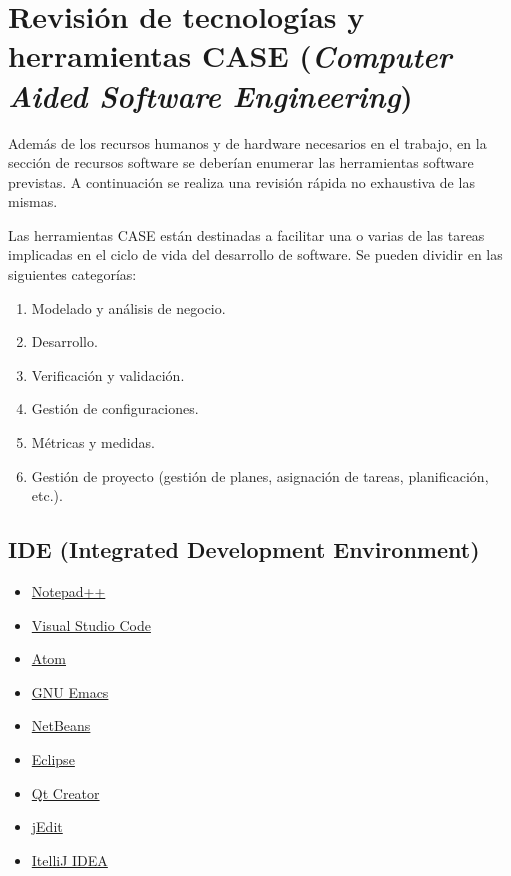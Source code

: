 \section[Tecnologías]{Revisión de tecnologías y herramientas CASE (\emph{Computer Aided Software Engineering})}
Además de los recursos humanos y de hardware necesarios en el trabajo, en la sección de recursos software se deberían enumerar las herramientas software previstas. A continuación se realiza una revisión rápida no exhaustiva de las mismas.

Las herramientas CASE están destinadas a facilitar una o varias de las tareas implicadas en el ciclo de vida del desarrollo de software. Se pueden dividir en las siguientes categorías:

\begin{enumerate}[noitemsep]
\item Modelado y análisis de negocio.
\item Desarrollo. 
\item Verificación y validación.
\item Gestión de configuraciones.
\item Métricas y medidas.
\item Gestión de proyecto (gestión de planes, asignación de tareas, planificación, etc.).
\end{enumerate}



\subsection{IDE (Integrated Development Environment)}
\begin{multicols}{2}
\begin{itemize}[nosep]
\item \href{https://notepad-plus-plus.org/}{Notepad++}
\item \href{https://code.visualstudio.com/}{Visual Studio Code}
\item \href{https://atom.io/}{Atom}
\item \href{https://www.gnu.org/s/emacs/}{GNU Emacs}
\item \href{https://netbeans.org/}{NetBeans}
\item \href{https://eclipse.org/}{Eclipse}
\item \href{https://www.qt.io/ide/}{Qt Creator}
\item \href{http://www.jedit.org/}{jEdit}
\item \href{https://www.jetbrains.com/idea/}{ItelliJ IDEA}
\end{itemize}
\end{multicols}



